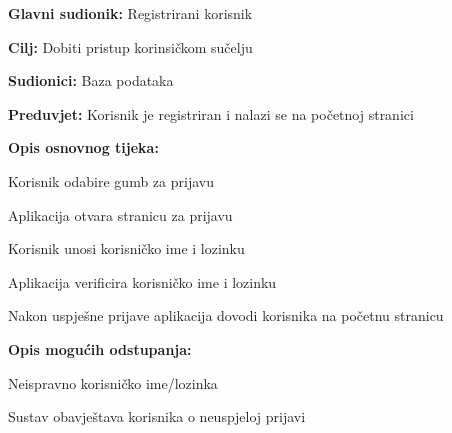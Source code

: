 				\noindent {}
					\begin{packed_item}
	
						\item \textbf{Glavni sudionik: }Registrirani korisnik
						\item  \textbf{Cilj:} Dobiti pristup korinsičkom sučelju
						\item  \textbf{Sudionici:} Baza podataka
						\item  \textbf{Preduvjet:} Korisnik je registriran i nalazi se na početnoj stranici
						\item  \textbf{Opis osnovnog tijeka:}
						
						\item[] \begin{packed_enum}
	
							\item Korisnik odabire gumb za prijavu
							\item Aplikacija otvara stranicu za prijavu
							\item Korisnik unosi korisničko ime i lozinku
							\item Aplikacija verificira korisničko ime i lozinku
							\item Nakon uspješne prijave aplikacija dovodi korisnika na početnu stranicu
							
						\end{packed_enum}
						
						\item  \textbf{Opis mogućih odstupanja:}
						
						\item[] \begin{packed_item}
	
							\item[4.a] Neispravno korisničko ime/lozinka
							
								\begin{packed_item}
								
									\item Sustav obavještava korisnika o neuspjeloj prijavi
									
								\end{packed_item}
							
						\end{packed_item}				
					\end{packed_item}
					
